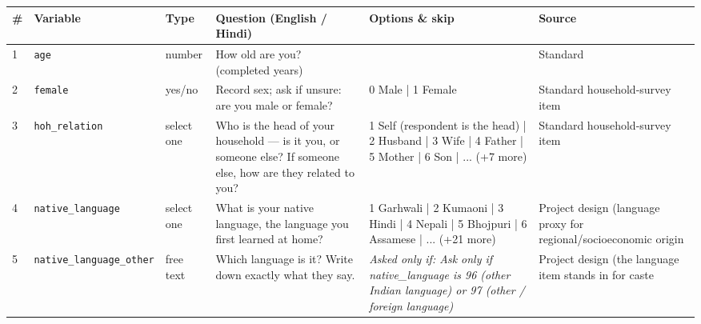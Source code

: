 \documentclass[9pt,a4paper,landscape]{article}
\begin{document}
\begin{longtable}{@{}p{0.5cm}p{3.3cm}p{1.7cm}p{7.3cm}p{5.6cm}p{5.4cm}@{}}
\toprule \footnotesize\textbf{\#} & \footnotesize\textbf{Variable} & \footnotesize\textbf{Type} & \footnotesize\textbf{Question (English / Hindi)} & \footnotesize\textbf{Options {\&} skip} & \footnotesize\textbf{Source}\\ \midrule
\endhead
\footnotesize 1 & \footnotesize\texttt{age} & \scriptsize number & \footnotesize How old are you? (completed years)\par\vspace{1pt}{\footnotesize\color{hdr}{\hifont आपकी उम्र कितनी है? (पूरे साल)}} & \scriptsize  & \scriptsize Standard\\
\footnotesize 2 & \footnotesize\texttt{female} & \scriptsize yes/no & \footnotesize Record sex; ask if unsure: are you male or female?\par\vspace{1pt}{\footnotesize\color{hdr}{\hifont आप पुरुष हैं या महिला?}} & \scriptsize 0 Male | 1 Female & \scriptsize Standard household-survey item\\
\footnotesize 3 & \footnotesize\texttt{hoh\_relation} & \scriptsize select one & \footnotesize Who is the head of your household — is it you, or someone else? If someone else, how are they related to you?\par\vspace{1pt}{\footnotesize\color{hdr}{\hifont आपके घर का मुखिया कौन है — आप खुद, या कोई और? अगर कोई और है, तो वे आपके क्या लगते हैं?}} & \scriptsize 1 Self (respondent is the head) | 2 Husband | 3 Wife | 4 Father | 5 Mother | 6 Son | ... (+7 more) & \scriptsize Standard household-survey item\\
\footnotesize 4 & \footnotesize\texttt{native\_language} & \scriptsize select one & \footnotesize What is your native language, the language you first learned at home?\par\vspace{1pt}{\footnotesize\color{hdr}{\hifont आपकी मातृभाषा कौन सी है — वह भाषा जो आपने घर में सबसे पहले सीखी?}} & \scriptsize 1 Garhwali | 2 Kumaoni | 3 Hindi | 4 Nepali | 5 Bhojpuri | 6 Assamese | ... (+21 more) & \scriptsize Project design (language proxy for regional/socioeconomic origin\\
\footnotesize 5 & \footnotesize\texttt{native\_language\_other} & \scriptsize free text & \footnotesize Which language is it? Write down exactly what they say.\par\vspace{1pt}{\footnotesize\color{hdr}{\hifont वह कौन सी भाषा है? जैसा वे कहें वैसा ही लिख लीजिए।}} & \scriptsize \textit{Asked only if: Ask only if native\_language is 96 (other Indian language) or 97 (other / foreign language)} & \scriptsize Project design (the language item stands in for caste\\

\end{longtable}
\end{document}
